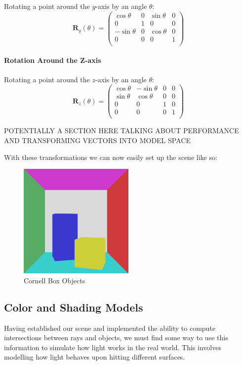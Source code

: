 \documentclass[12pt]{article}
\begin{document}
Rotating a point around the \(y\)-axis by an angle \(\theta\):
\[
    \mathbf{R}_y(\theta) = \begin{pmatrix}
        \cos \theta  & 0 & \sin \theta & 0 \\
        0            & 1 & 0           & 0 \\
        -\sin \theta & 0 & \cos \theta & 0 \\
        0            & 0 & 0           & 1 \\
    \end{pmatrix}
\]

\paragraph{Rotation Around the Z-axis}

Rotating a point around the \(z\)-axis by an angle \(\theta\):
\[
    \mathbf{R}_z(\theta) = \begin{pmatrix}
        \cos \theta & -\sin \theta & 0 & 0 \\
        \sin \theta & \cos \theta  & 0 & 0 \\
        0           & 0            & 1 & 0 \\
        0           & 0            & 0 & 1 \\
    \end{pmatrix}
\]

POTENTIALLY A SECTION HERE TALKING ABOUT PERFORMANCE AND TRANSFORMING VECTORS INTO MODEL SPACE

With these transformations we can now easily set up the scene like so:
\begin{figure}[H]
    \centering
    \includegraphics[width=0.5\textwidth]{images/artsy_rep/no_lighting_cornell.png}
    \caption{Cornell Box Objects}
    \label{fig:unlitcornell}
\end{figure}


\subsection{Color and Shading Models}
Having established our scene and implemented the ability to compute intersections between rays and objects, we must find some way to use this information to simulate how light works in the real world. This involves modelling how light behaves upon hitting different surfaces.
\end{document}
